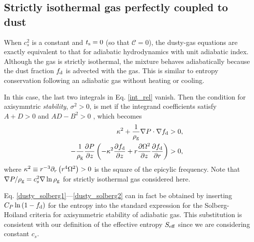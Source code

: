 \subsection{Strictly isothermal gas perfectly coupled to dust}\label{iso_perfect}
When $c_s^2$ is a constant and $t_\mathrm{s}=0$ (so that $\mathcal{C} = 0$), the dusty-gas equations are
exactly equivalent to that for adiabatic hydrodynamics with unit
adiabatic 
index. Although the gas is strictly isothermal, the mixture behaves 
adiabatically because the dust fraction $f_\mathrm{d}$ is advected with 
the gas. This is similar to entropy conservation following an 
adiabatic gas without heating or cooling.  

In this case, the last two integrals in Eq. \ref{int_rel} vanish. 
Then the condition for axisymmtric \emph{stability}, $\sigma^2>0$, 
is met if the integrand coefficients satisfy $A+D>0$ and $AD-B^2>0$
\citep[][Section 11.6]{ogilvie16}, which becomes 
\begin{align}
  \kappa^2 + \frac{1}{\rho_\mathrm{g}}\nabla P \cdot\nabla f_\mathrm{d} &> 0,\label{dusty_solberg1}  \\
  -\frac{1}{\rho_\mathrm{g}}\frac{\partial P}{\partial z}\left(-\kappa^2\frac{\partial f_\mathrm{d}}{\partial
    z} + r\frac{\partial\Omega^2}{\partial z}\frac{\partial f_\mathrm{d}}{\partial r} \right) & > 0, \label{dusty_solberg2}
\end{align} 
where %
$\kappa^2 \equiv r^{-3}\partial_r\left(r^4\Omega^2\right)>0$ is the 
square of the epicylic frequency. Note that $\nabla P/\rho_\mathrm{g} =
c_s^2\nabla \ln{\rho_\mathrm{g}}$ for strictly isothermal gas considered here. 
 
Eq. \ref{dusty_solberg1}---\ref{dusty_solberg2} can in fact be obtained by
inserting $C_P\ln{\left(1 - 
    f_\mathrm{d}\right)}$ for the entropy into the standard
expression for the Solberg-Hoiland criteria 
\citep{tassoul78} for axisymmetric stability of adiabatic gas. 
This substitution is 
consistent with our definition of the effective entropy $S_\mathrm{eff}$ since
we are considering constant $c_s$. 

